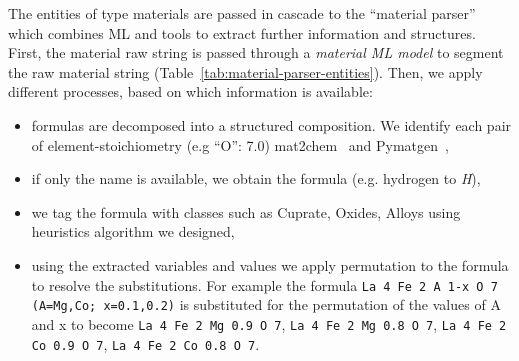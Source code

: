 \documentclass{article}
\begin{document}
The entities of type materials are passed in cascade to the ``material parser'' which combines ML and tools to extract further information and structures. 
First, the material raw string is passed through a \textit{material ML model} to segment the raw material string (Table~\ref{tab:material-parser-entities}). 
Then, we apply different processes, based on which information is available: 
\begin{itemize}
    \item formulas are decomposed into a structured composition. We identify each pair of element-stoichiometry (e.g ``O'': 7.0) mat2chem~\cite{kononova_text-mined_2019} and Pymatgen~\cite{Ong2013}, 
    \item if only the name is available, we obtain the formula (e.g. hydrogen to \textit{H}), 
    \item we tag the formula with classes such as Cuprate, Oxides, Alloys using heuristics algorithm we designed, 
    \item using the extracted variables and values we apply permutation to the  formula to resolve the substitutions. For example the formula \texttt{La 4 Fe 2 A 1-x O 7 (A=Mg,Co; x=0.1,0.2)} is substituted for the permutation of the values of A and x to become \texttt{La 4 Fe 2 Mg 0.9 O 7}, \texttt{La 4 Fe 2 Mg 0.8 O 7}, \texttt{La 4 Fe 2 Co 0.9 O 7}, \texttt{La 4 Fe 2 Co 0.8 O 7}.
\end{itemize}

\begin{table}[ht]
\centering
{}
\caption{\label{tab:material-parser-entities} Synthesis of the material parser entities. }
\end{table}
\end{document}
